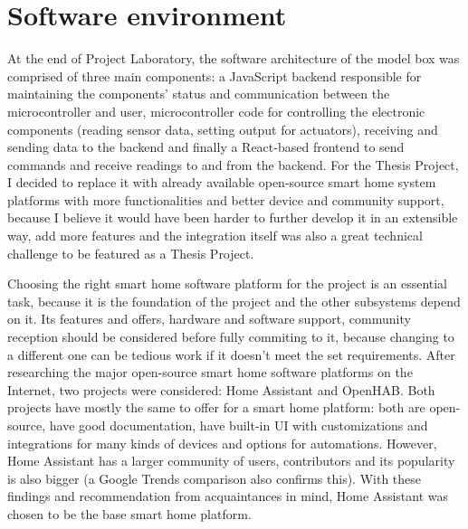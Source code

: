 \section{Software environment}

At the end of Project Laboratory, the software architecture of the model box was comprised of three main components: a JavaScript backend responsible for maintaining the components' status and communication between the microcontroller and user, microcontroller code for controlling the electronic components (reading sensor data, setting output for actuators), receiving and sending data to the backend and finally a React-based frontend to send commands and receive readings to and from the backend. For the Thesis Project, I decided to replace it with already available open-source smart home system platforms with more functionalities and better device and community support, because I believe it would have been harder to further develop it in an extensible way, add more features and the integration itself was also a great technical challenge to be featured as a Thesis Project.

Choosing the right smart home software platform for the project is an essential task, because it is the foundation of the project and the other subsystems depend on it. Its features and offers, hardware and software support, community reception should be considered before fully commiting to it, because changing to a different one can be tedious work if it doesn't meet the set requirements. After researching the major open-source smart home software platforms on the Internet, two projects were considered: Home Assistant and OpenHAB. \cite{HAHomepage} \cite{openHABHomepage} Both projects have mostly the same to offer for a smart home platform: both are open-source, have good documentation, have built-in UI with customizations and integrations for many kinds of devices and options for automations. However, Home Assistant has a larger community of users, contributors and its popularity is also bigger (a Google Trends comparison also confirms this). \cite{WunderTechHAvsopenHAB} With these findings and recommendation from acquaintances in mind, Home Assistant was chosen to be the base smart home platform.

